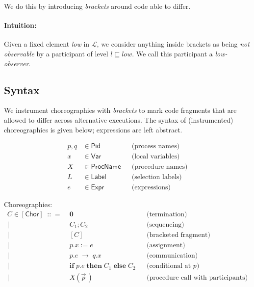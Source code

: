 \documentclass[12pt,a4paper,twoside]{book}
\newcommand{\metaDeff}{\mathrel{\mathop{::}}=}
\newcommand{\MCL}{\mathscr{L}}
\begin{document}
We do this by introducing \emph{brackets} around code able to differ.

\paragraph{Intuition:} Given a fixed element \textit{low} in $\MCL$, we consider anything inside brackets as being \emph{not observable} by a participant of level $l \sqsubseteq \textit{low}$. We call this participant a \emph{low-observer}.

\subsection{Syntax}
We instrument choreographies with \emph{brackets} to mark code fragments that are allowed to differ across alternative executions. The syntax of (instrumented) choreographies is given below; expressions are left abstract.

\begin{align*}
p,q &\in \mathsf{Pid}            && \text{(process names)}\\
x   &\in \mathsf{Var}          && \text{(local variables)}\\
X   &\in \mathsf{ProcName}       && \text{(procedure names)}\\
L   &\in \mathsf{Label}          && \text{(selection labels)}\\
e   &\in \mathsf{Expr}           && \text{(expressions)}
\end{align*}

\noindent Choreographies:
\[
\begin{array}{rcll}
C \in \mathsf{[Chor]} \;\metaDeff\;
  & \boldsymbol{0}                          & & \text{(termination)}\\
\mid& C_1 \mathbin{;} C_2                   & & \text{(sequencing)}\\
	\mid& [C] & & \text{(bracketed fragment)}\\
\mid& p.x \mathrel{:=} e                    & & \text{(assignment)}\\
\mid& p.e \;\rightarrow\; q.x               & & \text{(communication)}\\
\mid& \mathbf{if}\; p.e\; \mathbf{then}\; C_1\; \mathbf{else}\; C_2
                                           & & \text{(conditional at }p\text{)}\\
	\mid& X(\vec{p}\,)        & & \text{(procedure call with participants)}
\end{array}
\]
\end{document}
